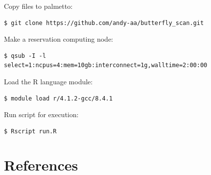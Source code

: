 \documentclass[
]{article}
\begin{document}
Copy files to palmetto:

\begin{verbatim}
$ git clone https://github.com/andy-aa/butterfly_scan.git
\end{verbatim}

Make a reservation computing node:

\begin{verbatim}
$ qsub -I -l select=1:ncpus=4:mem=10gb:interconnect=1g,walltime=2:00:00
\end{verbatim}

Load the R language module:

\begin{verbatim}
$ module load r/4.1.2-gcc/8.4.1
\end{verbatim}

Run script for execution:

\begin{verbatim}
$ Rscript run.R
\end{verbatim}

\hypertarget{references}{%
\section{References}\label{references}}
\end{document}
